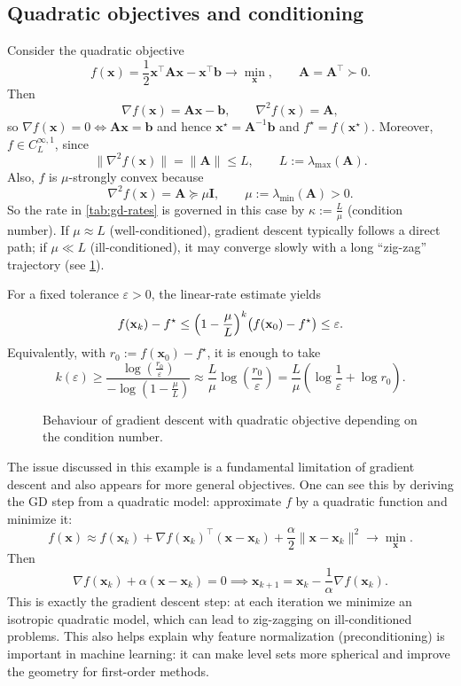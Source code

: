 \subsection{Quadratic objectives and conditioning}
\begin{example}
Consider the quadratic objective
\[
  f(\mathbf{x})=\frac{1}{2}\mathbf{x}^{\top}\mathbf{A}\mathbf{x}-\mathbf{x}^{\top}\mathbf{b}
  \to \min_{\mathbf{x}},
  \qquad
  \mathbf{A}=\mathbf{A}^{\top}\succ 0.
\]
Then
\[
  \nabla f(\mathbf{x})=\mathbf{A}\mathbf{x}-\mathbf{b},
  \qquad
  \nabla^{2} f(\mathbf{x})=\mathbf{A},
\]
so $\nabla f(\mathbf{x})=0\iff \mathbf{A}\mathbf{x}=\mathbf{b}$ and hence
$\mathbf{x}^\star=\mathbf{A}^{-1}\mathbf{b}$ and $f^\star=f(\mathbf{x}^\star)$.
Moreover, $f\in C_{L}^{\infty,1}$, since
\[
  \|\nabla^2 f(\mathbf{x})\|=\|\mathbf{A}\|\le L,
  \qquad
  L:=\lambda_{\max}(\mathbf{A}).
\]
Also, $f$ is $\mu$-strongly convex because
\[
  \nabla^{2} f(\mathbf{x})=\mathbf{A}\succeq \mu \mathbf{I},
  \qquad
  \mu:=\lambda_{\min}(\mathbf{A})>0.
\]
So the rate in \cref{tab:gd-rates} is governed in this case by
$\kappa := \frac{L}{\mu}$ (condition number). If $\mu \approx L$ (well-conditioned), 
gradient descent typically follows a direct path; if
$\mu\ll L$ (ill-conditioned), it may converge slowly with a long ``zig-zag'' trajectory (see
\cref{fig:gd-zig-zag}).

\medskip
\noindent For a fixed tolerance $\varepsilon>0$, the linear-rate estimate yields
\[
  f(\mathbf{x}_k)-f^\star \le \Bigl(1-\frac{\mu}{L}\Bigr)^k\bigl(f(\mathbf{x}_0)-f^\star\bigr)\le \varepsilon.
\]
Equivalently, with $r_0:=f(\mathbf{x}_0)-f^\star$, it is enough to take
\[
  k(\varepsilon)\ge
  \frac{\log\!\left(\frac{r_0}{\varepsilon}\right)}{-\log\!\left(1-\frac{\mu}{L}\right)}
  \approx \frac{L}{\mu}\log\!\left(\frac{r_0}{\varepsilon}\right)
  =\frac{L}{\mu}\left(\log \frac{1}{\varepsilon}+\log r_0\right).
\]
\end{example}

\begin{figure}[ht]
    \centering
    \caption{Behaviour of gradient descent with quadratic objective depending on the condition number.}
    \label{fig:gd-zig-zag}
\end{figure}
The issue discussed in this example is a fundamental limitation of gradient descent and also
appears for more general objectives. One can see this by deriving the GD step from a quadratic
model: approximate $f$ by a quadratic function and minimize it:
\[
  f(\mathbf{x}) \approx f(\mathbf{x}_k) + \nabla f(\mathbf{x}_k)^{\top}(\mathbf{x}-\mathbf{x}_k) +
  \frac{\alpha}{2} \|\mathbf{x} - \mathbf{x}_k\|^2 \to \min_{\mathbf{x}}.
\]
Then
\[
  \nabla f(\mathbf{x}_k) + \alpha (\mathbf{x} - \mathbf{x}_k) = 0
  \implies
  \mathbf{x}_{k+1} = \mathbf{x}_k - \frac{1}{\alpha}\nabla f(\mathbf{x}_k).
\]
This is exactly the gradient descent step: at each iteration we minimize an isotropic quadratic
model, which can lead to zig-zagging on ill-conditioned problems. This also helps explain why
feature normalization (preconditioning) is important in machine learning: it can make level sets
more spherical and improve the geometry for first-order methods.

